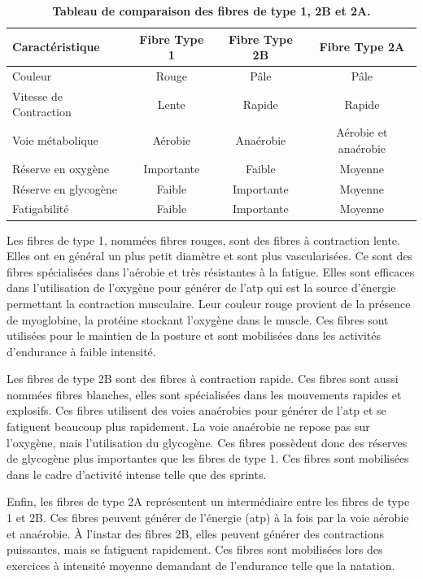 \begin{table}[!ht]
\centering
\begin{tabular}{|l|c|c|c|} 
 \hline
 \textbf{Caractéristique} & \textbf{Fibre Type 1} & \textbf{Fibre Type 2B} & \textbf{Fibre Type 2A} \\
 \hline
Couleur & Rouge & Pâle & Pâle \\
Vitesse de Contraction & Lente & Rapide & Rapide \\
Voie métabolique & Aérobie & Anaérobie & Aérobie et anaérobie \\
Réserve en oxygène & Importante & Faible & Moyenne \\
Réserve en glycogène & Faible & Importante & Moyenne \\
Fatigabilité & Faible & Importante & Moyenne \\
 \hline
\end{tabular}
\caption[Tableau de comparaison des fibres de type 1, 2B et 2A.]{\textbf{Tableau de comparaison des fibres de type 1, 2B et 2A.}}
\label{table:fiber-compare}
\end{table}

Les fibres de type 1, nommées fibres rouges, sont des fibres à contraction lente. Elles ont en général un plus petit diamètre et sont plus vascularisées. Ce sont des fibres spécialisées dans l'aérobie et très résistantes à la fatigue. Elles sont efficaces dans l'utilisation de l'oxygène pour générer de l'\gls{atp} qui est la source d'énergie permettant la contraction musculaire. Leur couleur rouge provient de la présence de myoglobine, la protéine stockant l'oxygène dans le muscle. Ces fibres sont utilisées pour le maintien de la posture et sont mobilisées dans les activités d'endurance à faible intensité.


Les fibres de type 2B sont des fibres à contraction rapide. Ces fibres sont aussi nommées fibres blanches, elles sont spécialisées dans les mouvements rapides et explosifs. Ces fibres utilisent des voies anaérobies pour générer de l'\gls{atp} et se fatiguent beaucoup plus rapidement. La voie anaérobie ne repose pas sur l'oxygène, mais l'utilisation du glycogène. Ces fibres possèdent donc des réserves de glycogène plus importantes que les fibres de type 1. Ces fibres sont mobilisées dans le cadre d'activité intense telle que des sprints.


Enfin, les fibres de type 2A représentent un intermédiaire entre les fibres de type 1 et 2B. Ces fibres peuvent générer de l'énergie (\gls{atp}) à la fois par la voie aérobie et anaérobie. À l'instar des fibres 2B, elles peuvent générer des contractions puissantes, mais se fatiguent rapidement. Ces fibres sont mobilisées lors des exercices à intensité moyenne demandant de l'endurance telle que la natation.


